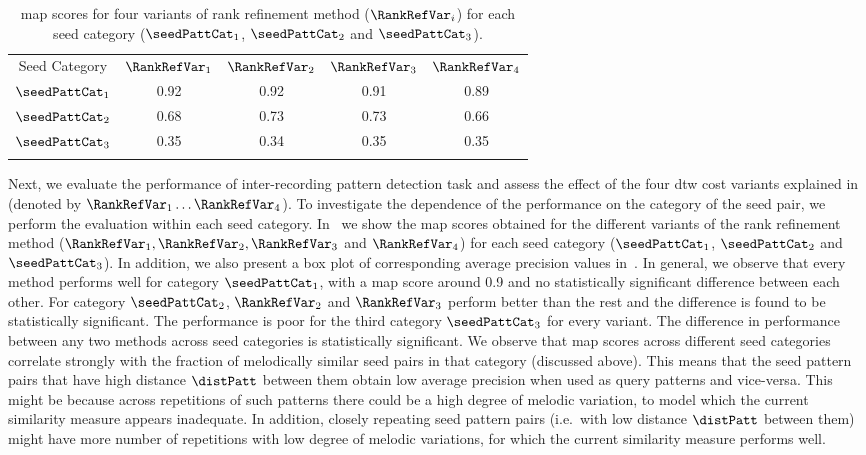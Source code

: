 \begin{table} 
	\begin{centering}	
		\begin{tabular}{ c | c c c c}
			\tabletop
			Seed Category   & $\RankRefVar_1$		&	$\RankRefVar_2$ & $\RankRefVar_3$	 &	$\RankRefVar_4$ 	\\	
			\tablemid
			$\seedPattCat_1$ & 0.92    &	0.92		&	0.91    &	0.89\\
			$\seedPattCat_2$ & 0.68    &	0.73		&	0.73    &	0.66\\
			$\seedPattCat_3$ & 0.35    &	0.34    &	0.35    &	0.35\\
			\tablebot
		\end{tabular}
		\caption[\acrshort{map} scores for four variants of rank refinement method for each seed pattern category]{\acrshort{map} scores for four variants of rank refinement method ($\RankRefVar_i$) for each seed category ($\seedPattCat_1$, $\seedPattCat_2$ and $\seedPattCat_3$).}
		\label{tab:meanAveragePrecision_pattern_discovery}
		\par \end{centering}	
\end{table}

Next, we evaluate the performance of inter-recording pattern detection task and assess the effect of the four \gls{dtw} cost variants explained in~ (denoted by $\RankRefVar_1 \dots \RankRefVar_4$). To investigate the dependence of the performance on the category of the seed pair, we perform the evaluation within each seed category. In~ we show the \gls{map} scores obtained for the different variants of the rank refinement method ($\RankRefVar_1, \RankRefVar_2, \RankRefVar_3$ and $\RankRefVar_4$) for each seed category ($\seedPattCat_1$, $\seedPattCat_2$ and $\seedPattCat_3$). In addition, we also present a box plot of corresponding average precision values in~. In general, we observe that every method performs well for category $\seedPattCat_1$, with a \gls{map} score around 0.9 and no statistically significant difference between each other. For category $\seedPattCat_2$, $\RankRefVar_2$ and $\RankRefVar_3$ perform better than the rest and the difference is found to be statistically significant. The performance is poor for the third category $\seedPattCat_3$ for every variant. The difference in performance between any two methods across seed categories is statistically significant. We observe that \gls{map} scores across different seed categories correlate strongly with the fraction of melodically similar seed pairs in that category (discussed above). This means that the seed pattern pairs that have high distance $\distPatt$ between them obtain low average precision when used as query patterns and vice-versa. This might be because across repetitions of such patterns there could be a high degree of melodic variation, to model which the current similarity measure appears inadequate. In addition, closely repeating seed pattern pairs (i.e.~with low distance $\distPatt$ between them) might have more number of repetitions with low degree of melodic variations, for which the current similarity measure performs well. 


